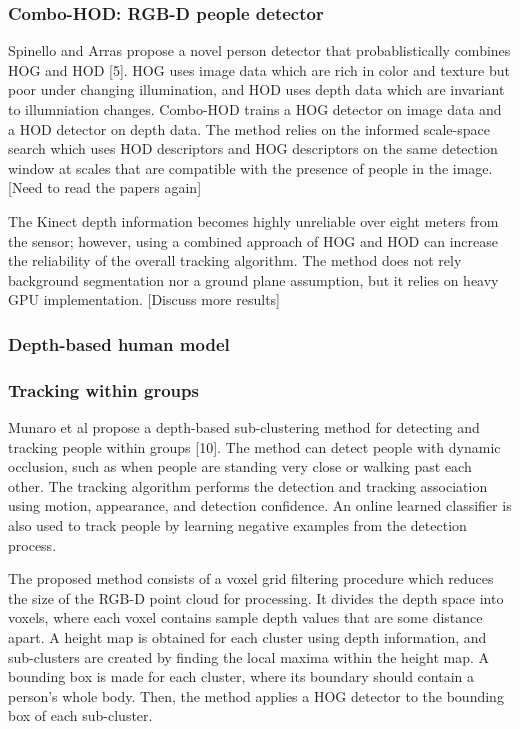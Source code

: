 \documentclass[paper=a4, fontsize=11pt]{scrartcl}
\numberwithin{equation}{section}		%
\numberwithin{figure}{section}			%
\numberwithin{table}{section}				%
\begin{document}
\subsubsection{Combo-HOD: RGB-D people detector}

Spinello and Arras propose a novel person detector that probablistically combines HOG and HOD [5]. HOG uses image data which are rich in color and texture but poor under changing illumination, and HOD uses depth data which are invariant to illumniation changes. Combo-HOD trains a HOG detector on image data and a HOD detector on depth data. The method relies on the informed scale-space search which uses HOD descriptors and HOG descriptors on the same detection window at scales that are compatible with the presence of people in the image. [Need to read the papers again]

The Kinect depth information becomes highly unreliable over eight meters from the sensor; however, using a combined approach of HOG and HOD can increase the reliability of the overall tracking algorithm. The method does not rely background segmentation nor a ground plane assumption, but it relies on heavy GPU implementation. [Discuss more results]

\subsubsection{Depth-based human model}


\subsubsection{Tracking within groups}

Munaro et al propose a depth-based sub-clustering method for detecting and tracking people within groups [10]. The method can detect people with dynamic occlusion, such as when people are standing very close or walking past each other. The tracking algorithm performs the detection and tracking association using motion, appearance, and detection confidence. An online learned classifier is also used to track people by learning negative examples from the detection process.

The proposed method consists of a voxel grid filtering procedure which reduces the size of the RGB-D point cloud for processing. It divides the depth space into voxels, where each voxel contains sample depth values that are some distance apart. A height map is obtained for each cluster using depth information, and sub-clusters are created by finding the local maxima within the height map. A bounding box is made for each cluster, where its boundary should contain a person's whole body. Then, the method applies a HOG detector to the bounding box of each sub-cluster.
\end{document}
